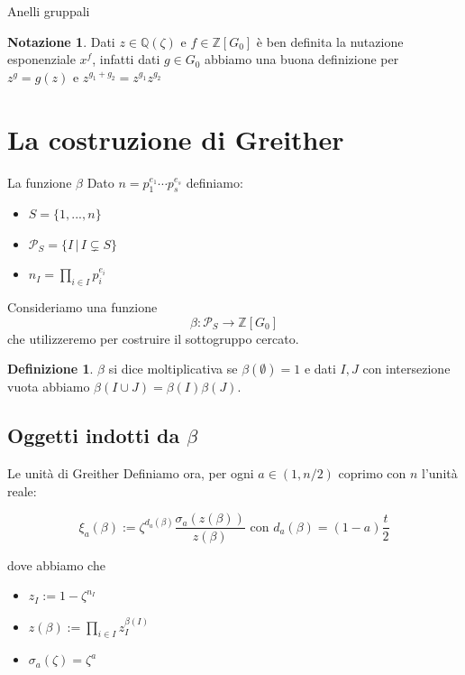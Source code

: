 \documentclass{beamer}
\theoremstyle{plain}
\theoremstyle{remark}
\theoremstyle{definition}
\newtheorem{deff}[teo]{Definizione}
\newtheorem*{nota}{Notazione}
\newcommand{\PS}{\mathcal{P}_S}
\newcommand{\Z}{\mathbb{Z}}
\newcommand{\Q}{\mathbb{Q}}
\begin{document}
	\begin{frame}{Anelli gruppali}
		\begin{nota}
				Dati $ z \in \Q (\zeta) $ e $ f \in \Z[G_0]  $ è ben definita la nutazione esponenziale $ x^f $, \pause infatti dati $ g\in G_0 $ abbiamo una buona definizione per  $ z^g = g(z) $ e $ z ^{g_1 + g_2}= z^{g_1} z^{g_2} $
		\end{nota}
	\end{frame}
	
\section{La costruzione di Greither}
	
	\begin{frame}[fragile]{La funzione $\beta$}
		Dato $ n= p_1 ^{e_1} \cdots p_s ^{e_s} $ definiamo: 
		\begin{itemize}
			\item $ S = \{1, ... , n \}$
			\item $ \PS = \{ I \,|\, I \subsetneq S\}$ 
			\item $ n_I = \prod_{i \in I} p_i ^{e_i} $ 
		\end{itemize} \pause
		Consideriamo una funzione $$ \beta : \PS \to \Z[G_0] $$ che utilizzeremo per costruire il sottogruppo cercato. \pause 
		\begin{deff}
			$\beta$ si dice moltiplicativa se $ \beta (\emptyset) = 1 $ e dati $ I,J $ con intersezione vuota abbiamo $ \beta (I\cup J) = \beta(I) \beta(J)$.
		\end{deff}
	\end{frame}

\subsection{Oggetti indotti da $\beta$}
	\begin{frame}{Le unità di Greither}
		Definiamo ora, per ogni $ a \in (1 , n/2)$ coprimo con $ n $ l'unità reale:
			\begin{exampleblock}{}
			\[
				\xi_a (\beta) := \zeta ^{d_a (\beta)} \frac{\sigma_a (z(\beta))}{z(\beta)} \text{ con } d_a(\beta)= (1-a)\frac{t}{2}
			\]
			\end{exampleblock}
			dove abbiamo che
			\begin{itemize}
				\item $ z_I  := 1 - \zeta ^{n_I}$
				\item $ z(\beta ):= \prod_{i\in I} z_I ^{\beta(I)} $
				\item $ \sigma_a(\zeta)= \zeta ^a $
			\end{itemize}
	\end{frame}	
	
\end{document}
